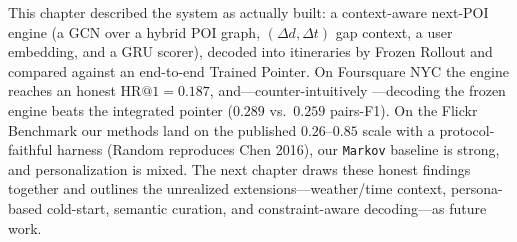 This chapter described the system as actually built: a context-aware next-POI engine (a GCN over
a hybrid POI graph, $(\Delta d,\Delta t)$ gap context, a user embedding, and a GRU scorer),
decoded into itineraries by Frozen Rollout and compared against an end-to-end Trained Pointer.
On Foursquare NYC the engine reaches an honest $\mathrm{HR@}1=0.187$, and---counter-intuitively
---decoding the frozen engine beats the integrated pointer ($0.289$ vs.\ $0.259$ pairs-F1).
On the Flickr Benchmark our methods land on the published $0.26$--$0.85$ scale with a
protocol-faithful harness (Random reproduces Chen 2016), our \texttt{Markov} baseline is strong,
and personalization is mixed. The next chapter draws these honest findings together and outlines
the unrealized extensions---weather/time context, persona-based cold-start, semantic curation,
and constraint-aware decoding---as future work.

